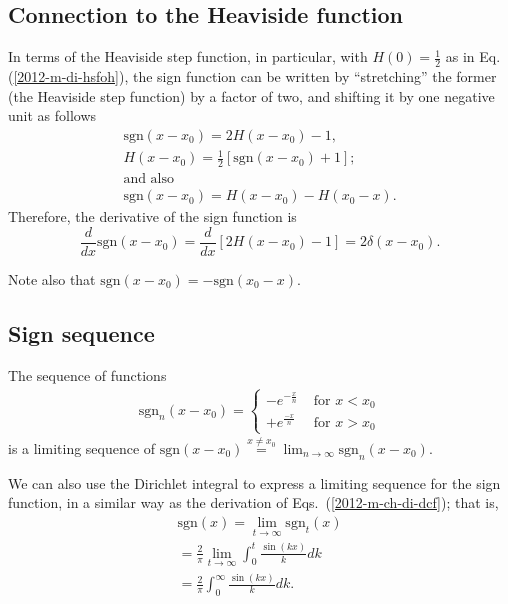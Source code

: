 \subsection{Connection to the Heaviside function}

In terms of  the  Heaviside step function, in particular, with
$H(0)=\frac{1}{2}$ as in Eq. (\ref{2012-m-di-hsfoh}),
the sign function can be written by ``stretching'' the former (the Heaviside step function) by a factor of two,
and shifting it by one negative unit as follows
\begin{equation}
\begin{split}
\textrm{sgn}(x-x_0) = 2H(x-x_0) -1,\\
H(x-x_0) = \frac{1}{2} \left[ \textrm{sgn}(x-x_0)+1\right];  \\
\textrm{and also}\\
\textrm{sgn}(x-x_0) = H(x-x_0) - H(x_0-x).
\end{split}
\label{2011-m-cbhsf}
\end{equation}
Therefore, the derivative of the sign function is
\begin{equation}
\frac{d}{dx}\textrm{sgn}(x-x_0) = \frac{d}{dx} \left[2H(x-x_0) -1\right] =2 \delta(x-x_0).
\end{equation}

Note also that  $\textrm{sgn}(x-x_0) =  - \textrm{sgn}(x_0-x)$.

\subsection{Sign sequence}


The sequence of functions
\begin{equation}
\begin{split}
\textrm{sgn}_n(x-x_0)
=
\left\{
\begin{array}{rl}
- e^{-\frac{x}{n}}&\textrm{ for } x < x_0\\
+ e^{\frac{-x}{n}}&\textrm{ for } x > x_0
\end{array}
\right.
\end{split}
\label{2012-m-ch-di-lsegn}
\end{equation}
is a limiting sequence of
$
\textrm{sgn}(x-x_0)\stackrel{x\neq x_0}{=} \lim_{n\rightarrow \infty} \textrm{sgn}_n(x-x_0)
$.


We can also use the Dirichlet integral
to express a limiting sequence for the sign function,
in a similar way as the derivation of Eqs.~(\ref{2012-m-ch-di-dcf}); that is,
\begin{equation}
\begin{split}
\textrm{sgn}(x)= \lim_{t \rightarrow \infty} \textrm{sgn}_t (x)
\\
= \frac{2}{\pi }\lim_{t \rightarrow \infty}\int_0^t \frac{\sin (kx)}{k} dk
\\
=
\frac{2}{\pi }\int_0^\infty \frac{\sin (kx)}{k} dk
.
\end{split}
\label{2015-m-ch-di-sign}
\end{equation}

